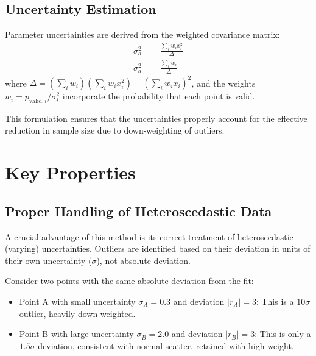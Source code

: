 \documentclass[twocolumn]{aastex631}
\begin{document}
\subsection{Uncertainty Estimation}
\label{sec:errors}

Parameter uncertainties are derived from the weighted covariance matrix:
\begin{align}
    \sigma_a^2 &= \frac{\sum_i w_i x_i^2}{\Delta} \\
    \sigma_b^2 &= \frac{\sum_i w_i}{\Delta}
    \label{eq:errors}
\end{align}
where $\Delta = (\sum_i w_i)(\sum_i w_i x_i^2) - (\sum_i w_i x_i)^2$, and the weights
$w_i = p_{\mathrm{valid},i}/\sigma_i^2$ incorporate the probability that each point
is valid.

This formulation ensures that the uncertainties properly account for the effective
reduction in sample size due to down-weighting of outliers.


\section{Key Properties}
\label{sec:properties}

\subsection{Proper Handling of Heteroscedastic Data}
\label{sec:heteroscedastic}

A crucial advantage of this method is its correct treatment of heteroscedastic
(varying) uncertainties. Outliers are identified based on their deviation in units
of their own uncertainty ($\sigma$), not absolute deviation.

Consider two points with the same absolute deviation from the fit:
\begin{itemize}
    \item Point A with small uncertainty $\sigma_A = 0.3$ and deviation $|r_A| = 3$:
          This is a $10\sigma$ outlier, heavily down-weighted.
    \item Point B with large uncertainty $\sigma_B = 2.0$ and deviation $|r_B| = 3$:
          This is only a $1.5\sigma$ deviation, consistent with normal scatter, retained
          with high weight.
\end{itemize}
\end{document}
